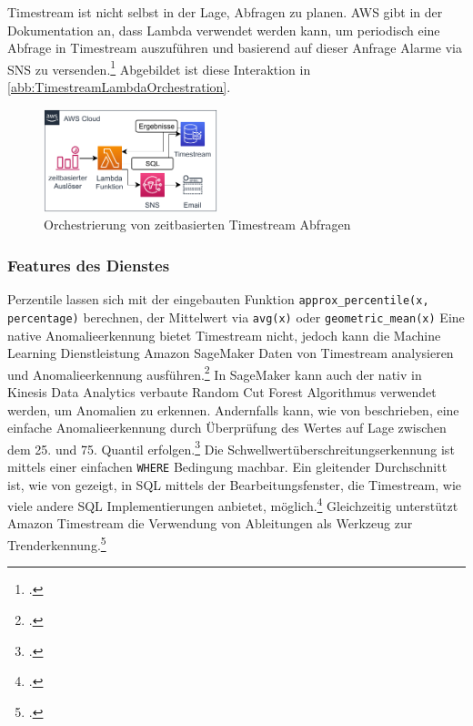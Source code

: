 

Timestream ist nicht selbst in der Lage, Abfragen zu planen. \ac{AWS} gibt in der Dokumentation an, dass Lambda verwendet werden kann, um periodisch eine Abfrage in Timestream auszuführen und basierend auf dieser Anfrage Alarme via \ac{SNS} zu versenden.\footcite[Vgl.][]{AmazonWebServicesInc..o.J.ag} Abgebildet ist diese Interaktion in \autoref{abb:TimestreamLambdaOrchestration}.


\begin{figure}[H]
\centering
\includegraphics[width=0.45\textwidth]{graphics/Lambda-Timestream-Orchestration.pdf}
\caption{Orchestrierung von zeitbasierten Timestream Abfragen}
\label{abb:TimestreamLambdaOrchestration}
\end{figure}

\subsubsection{Features des Dienstes}
Perzentile lassen sich mit der eingebauten Funktion \texttt{approx_percentile(x, percentage)} berechnen, der Mittelwert via \texttt{avg(x)} oder \texttt{geometric_mean(x)}
Eine native Anomalieerkennung bietet Timestream nicht, jedoch kann die Machine Learning Dienstleistung Amazon SageMaker Daten von Timestream analysieren und Anomalieerkennung ausführen.\footcite[Vgl. auch im Folgenden][]{AmazonWebServicesInc..o.J.aj} In SageMaker kann auch der nativ in Kinesis Data Analytics verbaute Random Cut Forest Algorithmus verwendet werden, um Anomalien zu erkennen. Andernfalls kann, wie von \citeauthor{Salgado.2019} beschrieben, eine einfache Anomalieerkennung durch Überprüfung des Wertes auf Lage zwischen dem 25. und 75. Quantil erfolgen.\footcite[Vgl.][]{Salgado.2019}
Die Schwellwertüberschreitungserkennung ist mittels einer einfachen \texttt{WHERE} Bedingung machbar.
Ein gleitender Durchschnitt ist, wie von \citeauthor{Ross.2020} gezeigt, in SQL mittels der Bearbeitungsfenster, die Timestream, wie viele andere \ac{SQL} Implementierungen anbietet, möglich.\footcite[Vgl.][]{Ross.2020} Gleichzeitig unterstützt Amazon Timestream die Verwendung von Ableitungen als Werkzeug zur Trenderkennung.\footcite[Vgl.][]{AmazonWebServicesInc..o.J.ai}

